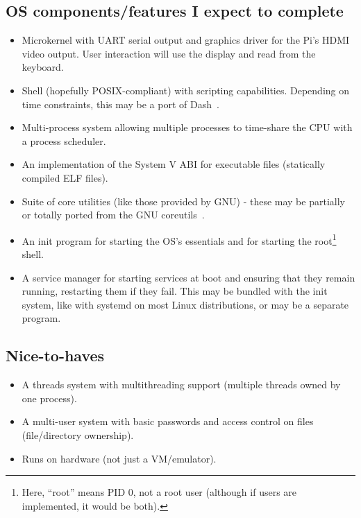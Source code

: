 \documentclass{article}
\begin{document}
\subsection*{OS components/features I expect to complete}
\begin{itemize}
    \item Microkernel with UART serial output and graphics driver for the Pi's
        HDMI video output. User interaction will use the display and read from
        the keyboard.
    \item Shell (hopefully POSIX-compliant) with scripting capabilities.
        Depending on time constraints, this may be a port of
        Dash~\cite{dash-shell}.
    \item Multi-process system allowing multiple processes to time-share the
        CPU with a process scheduler.
    \item An implementation of the System V ABI for executable files
        (statically compiled ELF files).
    \item Suite of core utilities (like those provided by GNU) - these may be
        partially or totally ported from the GNU
        coreutils~\cite{gnu-coreutils}.
    \item An init program for starting the OS's essentials and for starting the
        root\footnote{Here, ``root'' means PID 0, not a root user (although if
        users are implemented, it would be both).} shell.
    \item A service manager for starting services at boot and ensuring that
        they remain running, restarting them if they fail. This may be bundled
        with the init system, like with systemd on most Linux distributions, or
        may be a separate program.
\end{itemize}

\subsection*{Nice-to-haves}
\begin{itemize}
    \item A threads system with multithreading support (multiple threads owned
        by one process).
    \item A multi-user system with basic passwords and access control on files
        (file/directory ownership).
    \item Runs on hardware (not just a VM/emulator).
\end{itemize}
\end{document}
